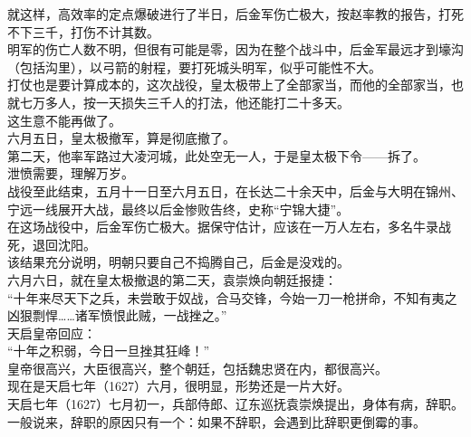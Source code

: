 \begin{multicols}{\theparacolNo}
就这样，高效率的定点爆破进行了半日，后金军伤亡极大，按赵率教的报告，打死不下三千，打伤不计其数。\\

明军的伤亡人数不明，但很有可能是零，因为在整个战斗中，后金军最远才到壕沟（包括沟里），以弓箭的射程，要打死城头明军，似乎可能性不大。\\

打仗也是要计算成本的，这次战役，皇太极带上了全部家当，而他的全部家当，也就七万多人，按一天损失三千人的打法，他还能打二十多天。\\

这生意不能再做了。\\

六月五日，皇太极撤军，算是彻底撤了。\\

第二天，他率军路过大凌河城，此处空无一人，于是皇太极下令——拆了。\\

泄愤需要，理解万岁。\\

战役至此结束，五月十一日至六月五日，在长达二十余天中，后金与大明在锦州、宁远一线展开大战，最终以后金惨败告终，史称“宁锦大捷”。\\

在这场战役中，后金军伤亡极大。据保守估计，应该在一万人左右，多名牛录战死，退回沈阳。\\

该结果充分说明，明朝只要自己不捣腾自己，后金是没戏的。\\

六月六日，就在皇太极撤退的第二天，袁崇焕向朝廷报捷：\\

“十年来尽天下之兵，未尝敢于奴战，合马交锋，今始一刀一枪拼命，不知有夷之凶狠剽悍……诸军愤恨此贼，一战挫之。”\\

天启皇帝回应：\\

“十年之积弱，今日一旦挫其狂峰！”\\

皇帝很高兴，大臣很高兴，整个朝廷，包括魏忠贤在内，都很高兴。\\

现在是天启七年（1627）六月，很明显，形势还是一片大好。\\

天启七年（1627）七月初一，兵部侍郎、辽东巡抚袁崇焕提出，身体有病，辞职。\\

一般说来，辞职的原因只有一个：如果不辞职，会遇到比辞职更倒霉的事。\\


\end{multicols}
